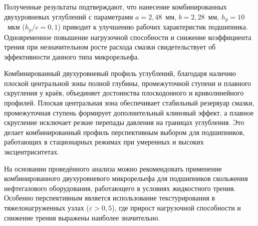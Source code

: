 Полученные результаты подтверждают, что нанесение комбинированных двухуровневых углублений с параметрами $a = 2{,}48$~мм, $b = 2{,}28$~мм, $h_p = 10$~мкм ($h_p/c = 0{,}1$) приводит к улучшению рабочих характеристик подшипника. Одновременное повышение нагрузочной способности и снижение коэффициента трения при незначительном росте расхода смазки свидетельствует об эффективности данного типа микрорельефа.

Комбинированный двухуровневый профиль углублений, благодаря наличию плоской центральной зоны полной глубины, промежуточной ступени и плавного скругления у краёв, объединяет достоинства плоскодонного и криволинейного профилей. Плоская центральная зона обеспечивает стабильный резервуар смазки, промежуточная ступень формирует дополнительный клиновый эффект, а плавное скругление исключает резкие перепады давления на границах углубления. Это делает комбинированный профиль перспективным выбором для подшипников, работающих в стационарных режимах при умеренных и высоких эксцентриситетах.

На основании проведённого анализа можно рекомендовать применение комбинированного двухуровневого микрорельефа для подшипников скольжения нефтегазового оборудования, работающего в условиях жидкостного трения. Особенно перспективным является использование текстурирования в тяжелонагруженных узлах ($\varepsilon > 0{,}5$), где прирост нагрузочной способности и снижение трения выражены наиболее значительно.
